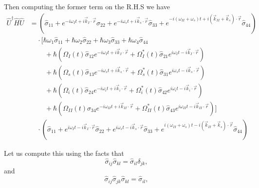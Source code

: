 \documentclass[aps,pra,showpacs,amsmath,amssymb,nofootinbib,longbibliography,superscriptaddress
]{revtex4-1}
\theoremstyle{definition}
\theoremstyle{remark}
\newcommand{\0}{\hat{0}}
\begin{document}
Then computing the former term on the R.H.S we have
\begin{align}
    \hat{U}^{\dagger} \hat{H} \hat{U}
    &= \left(\hat{\sigma}_{11} + e^{-i \omega_I t + i \vec{k}_I \cdot \vec{r}} \hat{\sigma}_{22} + e^{-i \omega_s t + i \vec{k}_s \cdot \vec{r}} \hat{\sigma}_{33} + e^{-i(\omega_{II} + \omega_s) t + i(\vec{k}_{II} + \vec{k}_s) \cdot \vec{r}} \hat{\sigma}_{44}\right) \nonumber\\
    &\;\;\;\;\cdot\biggl[ \hbar \omega_1 \hat{\sigma}_{11} + \hbar \omega_2 \hat{\sigma}_{22} + \hbar \omega_3 \hat{\sigma}_{33} + \hbar \omega_4 \hat{\sigma}_{44}\nonumber \\
    &\;\;\;\;\;\;\;\;+ \hbar \left(\Omega_{I}(t) \hat{\sigma}_{12} e^{-i \omega_I t + i \vec{k}_I \cdot \vec{r}} + \Omega_{I}^*(t) \hat{\sigma}_{21} e^{i \omega_I t - i \vec{k}_I \cdot \vec{r}}\right)\nonumber \\
    &\;\;\;\;\;\;\;\;+ \hbar \left(\Omega_{s}(t) \hat{\sigma}_{13} e^{-i \omega_s t + i \vec{k}_{s} \cdot \vec{r}} + \Omega_{s}^*(t) \hat{\sigma}_{31} e^{i \omega_s t - i \vec{k}_{s} \cdot \vec{r}}\right)\nonumber \\
    &\;\;\;\;\;\;\;\;+ \hbar \left(\Omega_{i}(t) \hat{\sigma}_{24} e^{-i \omega_i t + i \vec{k}_{i} \cdot \vec{r}} + \Omega_{i}^*(t) \hat{\sigma}_{42} e^{i \omega_i t - i \vec{k}_{i} \cdot \vec{r}}\right)\nonumber \\
    &\;\;\;\;\;\;\;\;+ \hbar \left(\Omega_{II}(t) \hat{\sigma}_{34} e^{-i \omega_{II} t + i \vec{k}_{II} \cdot \vec{r}} + \Omega_{II}^*(t) \hat{\sigma}_{43} e^{i \omega_{II} t - i \vec{k}_{II} \cdot \vec{r}}\right)\biggr] \nonumber\\
    &\;\;\;\; \cdot \left(\hat{\sigma}_{11} + e^{i \omega_I t - i \vec{k}_I \cdot \vec{r}} \hat{\sigma}_{22} + e^{i \omega_s t - i \vec{k}_s \cdot \vec{r}} \hat{\sigma}_{33} + e^{i(\omega_{II} + \omega_s) t - i(\vec{k}_{II} + \vec{k}_s) \cdot \vec{r}} \hat{\sigma}_{44}\right)
\end{align}





Let us compute this using the facts that
\begin{equation}
    \hat{\sigma}_{ij} \hat{\sigma}_{kl} = \hat{\sigma}_{il} \delta_{jk},
\end{equation}
and
\begin{equation}
    \hat{\sigma}_{ij} \hat{\sigma}_{jk} \hat{\sigma}_{kl} = \hat{\sigma}_{il},
\end{equation}
\end{document}
